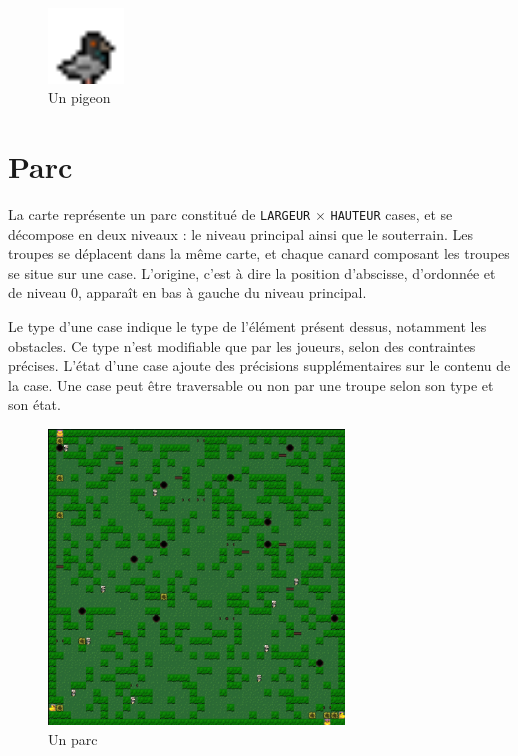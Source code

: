 \begin{figure}[ht]
    \centering
    \includegraphics[width=2cm]{img/sprite/pigeon.png}
    \caption{Un pigeon}
    \label{fig:pigeon}
\end{figure}

\section{Parc}

La carte représente un parc constitué de
\texttt{LARGEUR} $\times$ \texttt{HAUTEUR} cases, et se décompose en 
deux niveaux : le niveau principal ainsi que le souterrain.
Les troupes se déplacent dans la même carte, et chaque canard composant
les troupes se situe sur une case.
L'origine, c'est à dire la position d'abscisse, d'ordonnée et de niveau 0, apparaît
en bas à gauche du niveau principal.

Le type d'une case indique le type de l'élément présent dessus, notamment les
obstacles. Ce type n'est modifiable que par les joueurs, selon des contraintes
précises.
L'état d'une case ajoute des précisions supplémentaires sur le contenu de la case.
Une case peut être traversable ou non par une troupe selon son type et son état.

\begin{figure}[ht]
    \begin{center}
        \includegraphics[width=0.7\textwidth]{img/map} 
    \end{center}
    \caption{Un parc}
    \label{fig:parc}
\end{figure}

